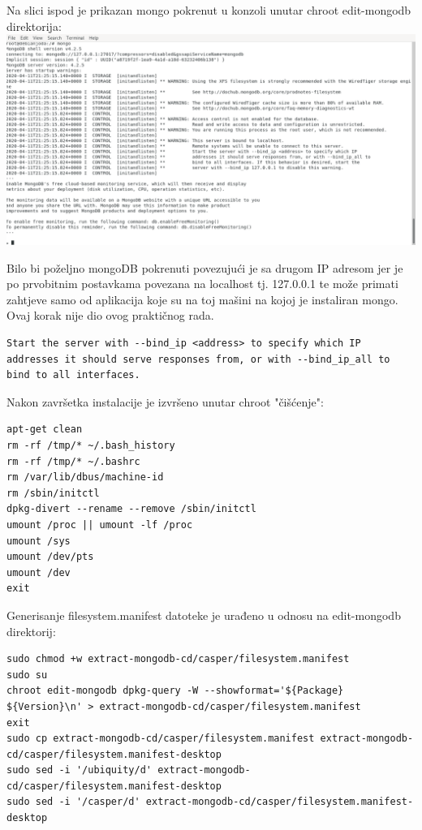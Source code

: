 \documentclass[12pt,vi]{mitthesis}
\begin{document}
Na slici ispod je prikazan mongo pokrenut u konzoli unutar chroot edit-mongodb direktorija:\\
\includegraphics[width=\linewidth]{images/mongoRunning.png}

Bilo bi poželjno mongoDB pokrenuti povezujući je sa drugom IP adresom jer je po prvobitnim postavkama povezana na localhost tj. 127.0.0.1 te može primati zahtjeve samo od aplikacija koje su na toj mašini na kojoj je instaliran mongo. Ovaj korak nije dio ovog praktičnog rada.
\begin{lstlisting}[style=BashInputStyle]
Start the server with --bind_ip <address> to specify which IP addresses it should serve responses from, or with --bind_ip_all to bind to all interfaces.
\end{lstlisting}
\noindent
Nakon završetka instalacije je izvršeno unutar chroot "čišćenje":
\begin{lstlisting}[style=BashInputStyle]
apt-get clean
rm -rf /tmp/* ~/.bash_history
rm -rf /tmp/* ~/.bashrc
rm /var/lib/dbus/machine-id
rm /sbin/initctl
dpkg-divert --rename --remove /sbin/initctl
umount /proc || umount -lf /proc
umount /sys
umount /dev/pts
umount /dev
exit
\end{lstlisting}

\noindent
Generisanje filesystem.manifest datoteke je urađeno u odnosu na edit-mongodb direktorij:
\begin{lstlisting}[style=BashInputStyle]
sudo chmod +w extract-mongodb-cd/casper/filesystem.manifest
sudo su
chroot edit-mongodb dpkg-query -W --showformat='${Package} ${Version}\n' > extract-mongodb-cd/casper/filesystem.manifest
exit
sudo cp extract-mongodb-cd/casper/filesystem.manifest extract-mongodb-cd/casper/filesystem.manifest-desktop
sudo sed -i '/ubiquity/d' extract-mongodb-cd/casper/filesystem.manifest-desktop
sudo sed -i '/casper/d' extract-mongodb-cd/casper/filesystem.manifest-desktop
\end{lstlisting}
\end{document}
